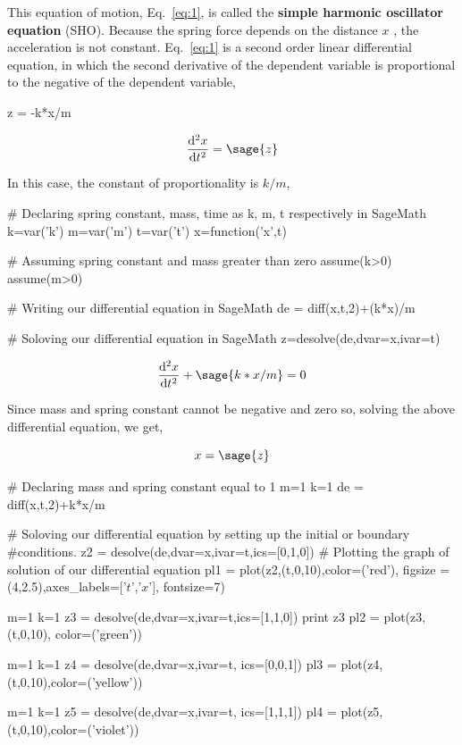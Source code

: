 This equation of motion, Eq.~\ref{eq:1}, is called the \textbf{simple harmonic 
oscillator equation} (SHO). Because the spring force depends on the distance 
$x$ , the acceleration is not constant. Eq.~\ref{eq:1} is a second order linear 
differential equation, in which the second derivative of the dependent variable 
is proportional to the negative of the dependent variable,

\begin{sagesilent}
z = -k*x/m
\end{sagesilent}

\begin{equation}
\frac{\mathrm{d}^{2}x}{\mathrm{d}t^{2}} = \sage{z}
\end{equation}

In this case, the constant of proportionality is $k/m$,

\begin{sagesilent}
# Declaring spring constant, mass, time as k, m, t respectively in SageMath
k=var('k')
m=var('m')
t=var('t')
x=function('x',t)

# Assuming spring constant and mass greater than zero
assume(k>0)
assume(m>0)

# Writing our differential equation in SageMath
de = diff(x,t,2)+(k*x)/m

# Soloving our differential equation in SageMath
z=desolve(de,dvar=x,ivar=t)
\end{sagesilent}

\begin{equation}
  \frac{\mathrm{d}^{2}x}{\mathrm{d}t^{2}} +  \sage{k*x/m} = 0
\end{equation}

Since mass and spring constant cannot be negative and zero so, solving the 
above differential equation, we get,

\begin{equation}
x = \sage{z}
\label{eq:2}
\end{equation}

\begin{sagesilent}
# Declaring mass and spring constant equal to 1
m=1
k=1
de = diff(x,t,2)+k*x/m

# Soloving our differential equation by setting up the initial or boundary 
#conditions.
z2 = desolve(de,dvar=x,ivar=t,ics=[0,1,0])
# Plotting the graph of solution of our differential equation
pl1 = plot(z2,(t,0,10),color=('red'), figsize = 
(4,2.5),axes_labels=['$t$','$x$'], fontsize=7)

m=1
k=1
z3 = desolve(de,dvar=x,ivar=t,ics=[1,1,0])
print z3
pl2 = plot(z3,(t,0,10), color=('green'))

m=1
k=1
z4 = desolve(de,dvar=x,ivar=t, ics=[0,0,1])
pl3 = plot(z4,(t,0,10),color=('yellow'))

m=1
k=1
z5 = desolve(de,dvar=x,ivar=t, ics=[1,1,1])
pl4 = plot(z5,(t,0,10),color=('violet'))
\end{sagesilent}

